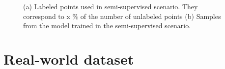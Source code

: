 \begin{figure}[!htb]
  \begin{subfigmatrix}{2}
  \end{subfigmatrix}
    \caption{(a) Labeled points used in semi-supervised scenario. They correspond to
     x \% of the number of unlabeled points (b) Samples from the model trained
    in the semi-supervised scenario.}
\label{fig:twocircles-semisup}
\end{figure}



\section{Real-world dataset}
